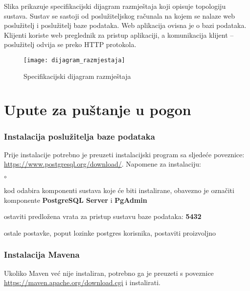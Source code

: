 {			{Slika prikazuje specifikacijski dijagram razmještaja koji opisuje topologiju sustava. Sustav se sastoji od poslužiteljskog računala na kojem se nalaze web poslužitelj i poslužitelj baze podataka. Web aplikacija ovisna je o bazi podataka. Klijenti koriste web preglednik za pristup aplikaciji, a komunikacija klijent – poslužitelj odvija se preko HTTP protokola.}
			 
			 \begin{figure}[H]
			 	
			 	\texttt{[image: dijagram\_razmjestaja]}
			 	\caption{Specifikacijski dijagram razmještaja}
			 	
			 \end{figure}
			
			\eject 
		
		\section{Upute za puštanje u pogon}
		
			\subsubsection{Instalacija poslužitelja baze podataka}
		
			Prije instalacije potrebno je preuzeti instalacijski program sa sljedeće poveznice:
				\href{https://www.postgresql.org/download/}{\underline{https://www.postgresql.org/download/}}.
			\newline\newline
			Napomene za instalaciju:
			\begin{list}{$\circ$}{}
				\item  kod odabira komponenti sustava koje će biti
				instalirane, obavezno je označiti komponente
	 			\textbf{PostgreSQL Server} i \textbf{PgAdmin} 

				\item  ostaviti predložena vrata za pristup
				sustavu baze podataka: \textbf{5432}
				\item  ostale postavke, poput lozinke postgres korisnika, postaviti proizvoljno
			\end{list}
		
			\subsubsection{Instalacija Mavena}
			Ukoliko Maven već nije instaliran, potrebno ga je preuzeti s poveznice\newline
			\href{https://maven.apache.org/download.cgi}{\underline{https://maven.apache.org/download.cgi}} i instalirati.
		
}
